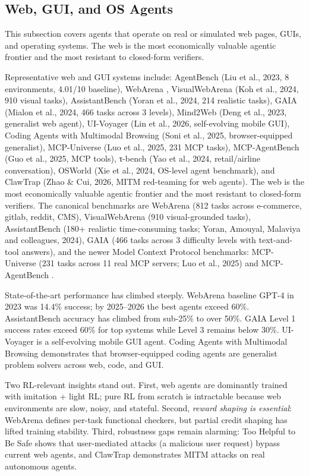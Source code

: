 \documentclass{article}
\begin{document}
\subsection{Web, GUI, and OS Agents}\label{web-gui-and-os-agents}

This subsection covers agents that operate on real or simulated web pages, GUIs, and operating systems. The web is the most economically valuable agentic frontier and the most resistant to closed-form verifiers.

Representative web and GUI systems include: AgentBench (Liu et al., 2023, 8 environments, 4.01/10 baseline), WebArena \citep{zhou20262026}, VisualWebArena (Koh et al., 2024, 910 visual tasks), AssistantBench (Yoran et al., 2024, 214 realistic tasks), GAIA (Mialon et al., 2024, 466 tasks across 3 levels), Mind2Web (Deng et al., 2023, generalist web agent), UI-Voyager (Lin et al., 2026, self-evolving mobile GUI), Coding Agents with Multimodal Browsing (Soni et al., 2025, browser-equipped generalist), MCP-Universe (Luo et al., 2025, 231 MCP tasks), MCP-AgentBench (Guo et al., 2025, MCP tools), τ-bench (Yao et al., 2024, retail/airline conversation), OSWorld (Xie et al., 2024, OS-level agent benchmark), and ClawTrap (Zhao \& Cui, 2026, MITM red-teaming for web agents). The web is the most economically valuable agentic frontier and the most resistant to closed-form verifiers. The canonical benchmarks are WebArena (812 tasks across e-commerce, gitlab, reddit, CMS), VisualWebArena (910 visual-grounded tasks), AssistantBench (180+ realistic time-consuming tasks; Yoran, Amouyal, Malaviya and colleagues, 2024), GAIA (466 tasks across 3 difficulty levels with text-and-tool answers), and the newer Model Context Protocol benchmarks: MCP-Universe (231 tasks across 11 real MCP servers; Luo et al., 2025) and MCP-AgentBench \citep{guo20252025}.

State-of-the-art performance has climbed steeply. WebArena baseline GPT-4 in 2023 was 14.4\% success; by 2025--2026 the best agents exceed 60\%. AssistantBench accuracy has climbed from sub-25\% to over 50\%. GAIA Level 1 success rates exceed 60\% for top systems while Level 3 remains below 30\%. UI-Voyager \citep{lin20262026} is a self-evolving mobile GUI agent. Coding Agents with Multimodal Browsing \citep{soni20252025} demonstrates that browser-equipped coding agents are generalist problem solvers across web, code, and GUI.

Two RL-relevant insights stand out. First, web agents are dominantly trained with imitation + light RL; pure RL from scratch is intractable because web environments are slow, noisy, and stateful. Second, \emph{reward shaping is essential}: WebArena defines per-task functional checkers, but partial credit shaping has lifted training stability. Third, robustness gaps remain alarming: Too Helpful to Be Safe \citep{chen20262026} shows that user-mediated attacks (a malicious user request) bypass current web agents, and ClawTrap \citep{zhao2026clawtrapamitmbased} demonstrates MITM attacks on real autonomous agents.
\end{document}
